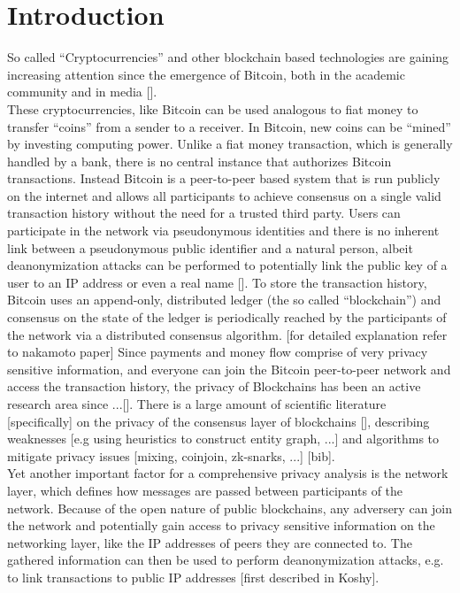 \section{Introduction \label{introduction}}
So called ``Cryptocurrencies'' and other blockchain based technologies are gaining
increasing attention since the emergence of Bitcoin, both in the academic community and in media []. \\
These cryptocurrencies, like Bitcoin can be used analogous to fiat money to transfer ``coins''
from a sender to a receiver. In Bitcoin, new coins can be ``mined'' by investing computing power.
Unlike a fiat money transaction, which is generally handled by a bank, there is no central instance
that authorizes Bitcoin transactions. Instead Bitcoin is a peer-to-peer based system that is run publicly on the internet
and allows all participants to achieve consensus on a single valid transaction history without the need for a trusted third party.
Users can participate in the network via pseudonymous identities and there is no inherent link between a pseudonymous public identifier and a natural person,
albeit deanonymization attacks can be performed to potentially link the public key of a user to an IP address or even a real name [].
To store the transaction history, Bitcoin uses an append-only, distributed ledger (the so called ``blockchain'')
and consensus on the state of the ledger is periodically reached
by the participants of the network via a distributed consensus algorithm. [for detailed explanation refer to nakamoto paper]
Since payments and money flow comprise of very privacy sensitive information, and everyone can join the Bitcoin peer-to-peer network
and access the transaction history, the privacy of Blockchains has been an active research area since ...[].
There is a large amount of scientific literature [specifically] on the privacy of the consensus layer of
blockchains [], describing weaknesses [e.g using heuristics to construct entity graph, ...] and algorithms to mitigate privacy issues [mixing, coinjoin, zk-snarks, ...] [bib]. \\
Yet another important factor for a comprehensive privacy analysis is the network layer, which
defines how messages are passed between participants of the network.
Because of the open nature of public blockchains, any adversery can join the network and potentially gain access to
privacy sensitive information on the networking layer, like the IP addresses of peers they are connected to.
The gathered information can then be used to perform deanonymization attacks, e.g. to link transactions to public IP addresses [first described in Koshy]. \\

